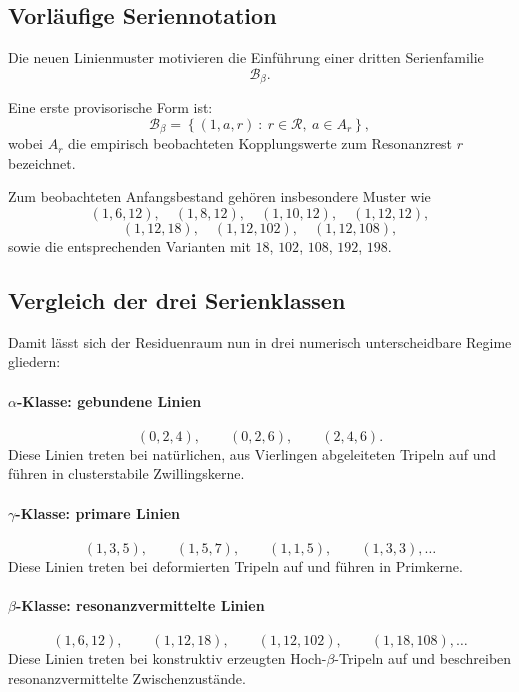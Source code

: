 \documentclass[11pt,a4paper]{article}
\theoremstyle{definition}
\theoremstyle{plain}
\theoremstyle{remark}
\begin{document}
	\subsection{Vorläufige Seriennotation}
	
	Die neuen Linienmuster motivieren die Einführung einer dritten Serienfamilie
	\[
	\mathcal B_\beta.
	\]
	
	Eine erste provisorische Form ist:
	\[
	\mathcal B_\beta
	=
	\left\{
	(1,a,r)\ :\ r\in\mathcal R,\ a\in A_r
	\right\},
	\]
	wobei \(A_r\) die empirisch beobachteten Kopplungswerte zum Resonanzrest \(r\) bezeichnet.
	
	Zum beobachteten Anfangsbestand gehören insbesondere Muster wie
	\[
	(1,6,12),\quad
	(1,8,12),\quad
	(1,10,12),\quad
	(1,12,12),
	\]
	\[
	(1,12,18),\quad
	(1,12,102),\quad
	(1,12,108),
	\]
	sowie die entsprechenden Varianten mit \(18\), \(102\), \(108\), \(192\), \(198\).
	
	\subsection{Vergleich der drei Serienklassen}
	
	Damit lässt sich der Residuenraum nun in drei numerisch unterscheidbare Regime gliedern:
	
	\paragraph{\(\alpha\)-Klasse: gebundene Linien}
	\[
	(0,2,4),\qquad (0,2,6),\qquad (2,4,6).
	\]
	Diese Linien treten bei natürlichen, aus Vierlingen abgeleiteten Tripeln auf und führen in clusterstabile Zwillingskerne.
	
	\paragraph{\(\gamma\)-Klasse: primare Linien}
	\[
	(1,3,5),\qquad (1,5,7),\qquad (1,1,5),\qquad (1,3,3),\dots
	\]
	Diese Linien treten bei deformierten Tripeln auf und führen in Primkerne.
	
	\paragraph{\(\beta\)-Klasse: resonanzvermittelte Linien}
	\[
	(1,6,12),\qquad (1,12,18),\qquad (1,12,102),\qquad (1,18,108),\dots
	\]
	Diese Linien treten bei konstruktiv erzeugten Hoch-\(\beta\)-Tripeln auf und beschreiben resonanzvermittelte Zwischenzustände.
	
\end{document}
